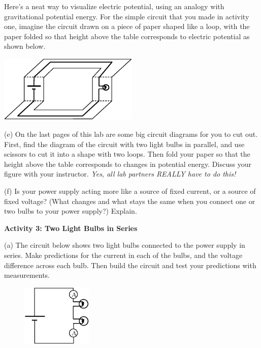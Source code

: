 Here's a neat way to visualize electric potential, using an analogy with gravitational potential energy.  For the simple circuit that you made in activity one, imagine the circuit drawn on a piece of paper shaped like a loop, with the paper folded so that height above the table corresponds to electric potential as shown below.
\begin{center}
\includegraphics[width=0.5\textwidth]{electric_circuits/how_to_fold.eps}
\end{center}
\vspace{-0.1in}

(e) On the last pages of this lab are some big circuit diagrams for you to cut out.  First, find the diagram of the circuit with two light bulbs in parallel, and use scissors to cut it into a shape with two loops.  Then fold your paper so that the height above the table corresponds to changes in potential energy.  Discuss your figure with your instructor.  \textit{Yes, all lab partners REALLY have to do this!}
\vspace{0.2 in}

(f) Is your power supply acting more like a source of fixed current, or a source of fixed voltage?  (What changes and what stays the same when you connect one or two bulbs to your power supply?) Explain.
\answerspace{0.6 in}


\pagebreak[2]
\textbf{Activity 3: Two Light Bulbs in Series} \par

(a) The circuit below shows two light bulbs connected to the power supply in series.  Make predictions for the current in each of the bulbs, and the voltage difference across each bulb.  Then build the circuit and test your predictions with measurements.  \par

\begin{figure}
    \vspace{-1.1 in}
    \includegraphics[width=0.3\textwidth]{electric_circuits/circ_diag4.eps}
\end{figure}

